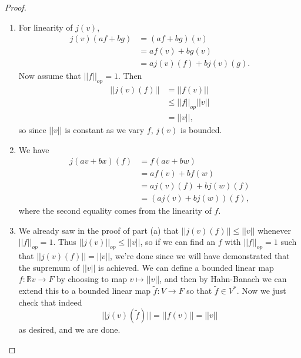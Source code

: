 \documentclass[12pt]{article}
\theoremstyle{definition}
\begin{document}
\begin{proof}\
	\begin{enumerate}[label=(\alph*)]
		\item For linearity of $j(v)$, \begin{align*}
			      j(v)(af + bg) & = (af + bg)(v)         \\
			                    & = af(v) + bg(v)        \\
			                    & = aj(v)(f) + bj(v)(g).
		      \end{align*}
		      Now assume that $||f||_{op} = 1$.
		      Then \begin{align*}
			      ||j(v)(f)|| & = ||f(v)||           \\
			                  & \leq ||f||_{op}||v|| \\
			                  & = ||v||,
		      \end{align*}
		      so since $||v||$ is constant as we vary $f$, $j(v)$ is bounded.
		\item We have \begin{align*}
			      j(av + bx)(f) & = f(av + bw)          \\
			                    & = af(v) + bf(w)       \\
			                    & = aj(v)(f) + bj(w)(f) \\
			                    & = (aj(v) + bj(w))(f),
		      \end{align*}
		      where the second equality comes from the linearity of $f$.
        \item We already saw in the proof of part (a) that $||j(v)(f)|| \leq ||v||$ whenever $||f||_{op} = 1$.
          Thus $||j(v)||_{op} \leq ||v||$, so if we can find an $f$ with $||f||_{op} = 1$ such that $||j(v)(f)|| = ||v||$, we're done since we will have demonstrated that the supremum of $||v||$ is achieved.
          We can define a bounded linear map $f : \mathbb{R}v \to F$ by choosing to map $v \mapsto ||v||$, and then by Hahn-Banach we can extend this to a bounded linear map $\widetilde{f} : V \to F$ so that $\widetilde{f} \in V^*$.
          Now we just check that indeed \begin{equation*}
            ||j(v)(\widetilde{f})|| = ||f(v)|| = ||v||
          \end{equation*}
          as desired, and we are done.
	\end{enumerate}
\end{proof}
\end{document}
